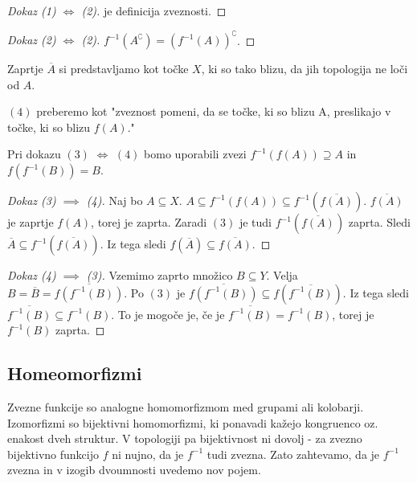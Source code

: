 \documentclass[11pt, a4paper]{article}
\begin{document}
    \begin{proof}[Dokaz \emph{(1)} \(\Longleftrightarrow\) \emph{(2)}]
        je definicija zveznosti.
    \end{proof}

    \begin{proof}[Dokaz \emph{(2)} \(\Longleftrightarrow\) \emph{(2)}]
        \(f^{-1}(A^\complement) = (f^{-1}(A))^\complement\).    
    \end{proof}

    Zaprtje \(\overline{A}\) si predstavljamo kot točke \(X\), ki so tako blizu, da jih topologija ne loči od \(A\).
    \par
    \((4)\) preberemo kot "zveznost pomeni, da se točke, ki so blizu A, preslikajo v točke, ki so blizu \(f(A)\)."

    \par
    Pri dokazu \((3)\) \(\Longleftrightarrow\) \((4)\) bomo uporabili zvezi \(f^{-1}(f (A)) \supseteq A\) in \(f(f^{-1} (B)) = B\).

    \begin{proof}[Dokaz \emph{(3)} \(\implies\) \emph{(4)}]
        Naj bo \(A \subseteq X\). \(A \subseteq f^{-1}(f (A)) \subseteq f^{-1}( \overline{f(A)}) \). \(\overline{f(A)}\) je zaprtje \(f(A)\), torej je zaprta. Zaradi \((3)\) je tudi \(f^{-1}(\overline{f(A)})\) zaprta. Sledi \(\overline{A} \subseteq f^{-1} (\overline{f(A)}) \). Iz tega sledi \(f(\overline{A}) \subseteq \overline{f(A)}\). 
        
    \end{proof}

    \begin{proof}[Dokaz \emph{(4)} \(\implies\) \emph{(3)}]
        Vzemimo zaprto množico \(B \subseteq Y\). Velja \(B = \overline{B} = \overline{f(f^{-1}(B))}\). Po \((3)\) je \(\overline{f(f^{-1}(B))} \subseteq f(\overline{f^{-1}(B)})\). Iz tega sledi \(\overline{f^{-1}(B)} \subseteq f^{-1}(B)\). To je mogoče je, če je \(\overline{f^{-1}(B)} = f^{-1}(B)\), torej je \(f^{-1}(B)\) zaprta.
    \end{proof}

    \subsection{Homeomorfizmi}

    Zvezne funkcije so analogne homomorfizmom med grupami ali kolobarji. Izomorfizmi so bijektivni homomorfizmi, ki ponavadi kažejo kongruenco oz. enakost dveh struktur. V topologiji pa bijektivnost ni dovolj - za zvezno bijektivno funkcijo \(f\) ni nujno, da je \(f^{-1}\) tudi zvezna. Zato zahtevamo, da je \(f^{-1}\) zvezna in v izogib dvoumnosti uvedemo nov pojem.
    
\end{document}
